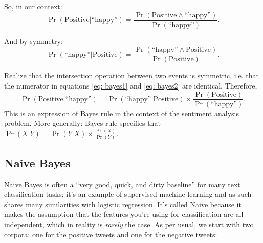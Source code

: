 \documentclass[12pt]{article}
\begin{document}
So, in our context:
\begin{equation}
  \label{eq: bayes1}
  \Pr(\textrm{Positive} | \textrm{``happy''}) = \frac{\Pr(\textrm{Positive} \land \textrm{``happy''})}{\Pr(\textrm{``happy''})}.
\end{equation}

And by symmetry:
\begin{equation}
  \label{eq: bayes2}
  \Pr(\textrm{``happy''} | \textrm{Positive}) = \frac{\Pr(\textrm{``happy''} \land \textrm{Positive})}{\Pr(\textrm{Positive})}.
\end{equation}

Realize that the intersection operation between two events is symmetric, i.e. that the numerator in equations \ref{eq: bayes1} and \ref{eq: bayes2} are identical. Therefore,
\begin{equation}
  \label{eq:bayesrulederivation}
  \Pr(\textrm{Positive} | \textrm{``happy''}) = \Pr(\textrm{``happy''} | \textrm{Positive}) \times \frac{\Pr(\textrm{Positive})}{\Pr(\textrm{``happy''})}.
\end{equation}
This is an expression of Bayes rule in the context of the sentiment analysis problem. More generally: Bayes rule specifies that $\Pr(X|Y) = \Pr(Y|X) \times  \frac{\Pr(X)}{\Pr(Y)}$.

\subsection{Naive Bayes}
\label{sec: naivebayes}
Naive Bayes is often a ``very good, quick, and dirty baseline'' for many text classification tasks; it's an example of supervised machine learning and as such shares many similarities with logistic regression. It's called Naive because it makes the assumption that the features you're using for classification are all independent, which in reality is \emph{rarely} the case. As per usual, we start with two corpora: one for the positive tweets and one for the negative tweets:
\end{document}
